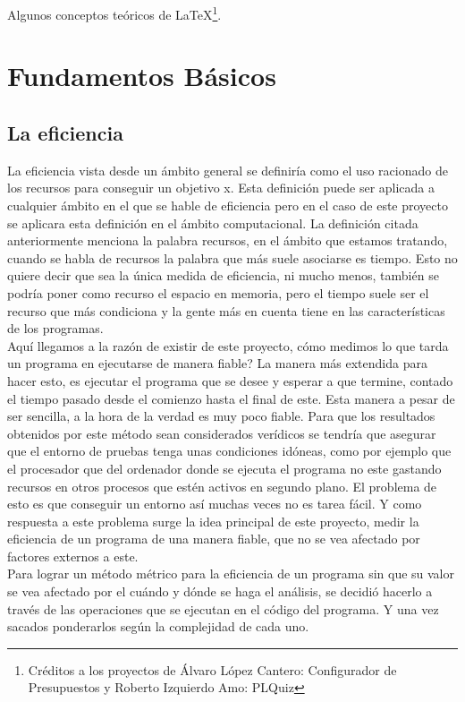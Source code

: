 

Algunos conceptos teóricos de \LaTeX \footnote{Créditos a los proyectos de Álvaro López Cantero: Configurador de Presupuestos y Roberto Izquierdo Amo: PLQuiz}.

\section{Fundamentos Básicos}

\subsection{La eficiencia}

La eficiencia vista desde un ámbito general se definiría como el uso racionado de los recursos para conseguir un objetivo x. Esta definición puede ser aplicada a cualquier ámbito en el que se hable de eficiencia pero en el caso de este proyecto se aplicara esta definición en el ámbito computacional.
La definición citada anteriormente menciona la palabra recursos, en el ámbito que estamos tratando, cuando se habla de recursos la palabra que más suele asociarse es tiempo. Esto no quiere decir que sea la única medida de eficiencia, ni mucho menos, también se podría poner como recurso el espacio en memoria, pero el tiempo suele ser el recurso que más condiciona y la gente más en cuenta tiene en las características de los  programas.\\
Aquí llegamos a la razón de existir de este proyecto, cómo medimos lo que tarda un programa en ejecutarse de manera fiable? La manera más extendida para hacer esto, es ejecutar el programa que se desee y esperar a que termine, contado el tiempo pasado desde el comienzo hasta el final de este. Esta manera a pesar de ser sencilla, a la hora de la verdad es muy poco fiable. Para que los resultados obtenidos por este método sean considerados verídicos se tendría que asegurar que el entorno de pruebas tenga unas condiciones idóneas, como por ejemplo que el procesador que del ordenador donde se ejecuta el programa no este gastando recursos en otros procesos que estén activos en segundo plano. El problema de esto es que conseguir un entorno así muchas veces no es tarea fácil. Y como respuesta a este problema surge la idea principal de este proyecto, medir la eficiencia de un programa de una manera fiable, que no se vea afectado por factores externos a este.\\
Para lograr un método métrico para la eficiencia de un programa sin que su valor se vea afectado por el cuándo y dónde se haga el análisis, se decidió hacerlo a través de las operaciones que se ejecutan en el código del programa. Y una vez sacados ponderarlos según la complejidad de cada uno. 

